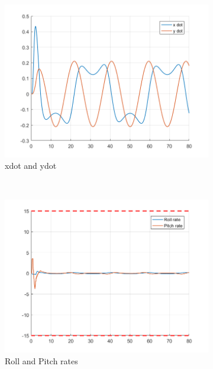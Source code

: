 \documentclass[11pt]{article}
\begin{document}
\begin{enumerate}
\begin{figure}[ht]
        \begin{subfigure}[c]{0.3\linewidth}
            \centering
            \includegraphics[width=\linewidth]{Plots_13_NonlinearModel_Lemniscate/07}
            \caption{xdot and ydot}
        \end{subfigure}
        ~
        \begin{subfigure}[c]{0.3\linewidth}
            \centering
            \includegraphics[width=\linewidth]{Plots_13_NonlinearModel_Lemniscate/08}
            \caption{Roll and Pitch rates}
        \end{subfigure}
        ~
        \begin{subfigure}[c]{0.3\linewidth}
            \centering

\end{subfigure}
\end{figure}
\end{enumerate}
\end{document}
